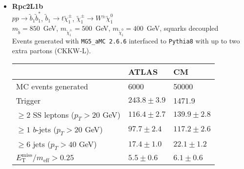 \documentclass[10pt,fleqn]{article}
\newcommand{\met}{E^\mathrm{miss}_\mathrm{T}}
\newcommand{\meff}{m_\mathrm{eff}}
\begin{document}
\begin{itemize}
 \item \textbf{Rpc2L1b}\\ $ p p \to \tilde{b}_1 \tilde{b}_1^* $, $\tilde{b}_1 \to t \tilde{\chi}_1^\pm$, $\tilde{\chi}_1^\pm \to W^\pm \tilde{\chi}_1^0$\\
 $m_{\tilde{b}} = 850$~GeV, $m_{\tilde{\chi}_1^\pm} = 500$~GeV, $m_{\tilde{\chi}_1^0} = 400$~GeV, squarks decoupled\\
 Events generated with \texttt{MG5\_aMC 2.6.6} interfaced to \texttt{Pythia8} with up to two extra partons (CKKW-L).
 \begin{tabular}{l|p{3cm}|p{3cm}} \toprule
                                           &  ATLAS           & CM    \\ \midrule
 MC events generated                       &  6000            & 50000 \\ \midrule
 Trigger                                   & $243.8\pm 3.9$   &  1471.9\\
 $\geq 2$ SS leptons ($p_T > 20$ GeV)      & $116.4\pm 2.7$   &  $139.9 \pm 2.8$\\ 
 $\geq 1$ $b$-jets ($p_T > 20$ GeV)        & $97.7\pm 2.4$    &  $117.2 \pm 2.6$\\
 $\geq 6$ jets ($p_T > 40$ GeV)            & $17.4\pm 1.0$    &  $22.1 \pm 1.2$\\
 $\met/\meff > 0.25 $                      & $ 5.5\pm 0.6$    &  $6.1 \pm 0.6$ \\   \bottomrule
 \end{tabular}
 

\end{itemize}
\end{document}
